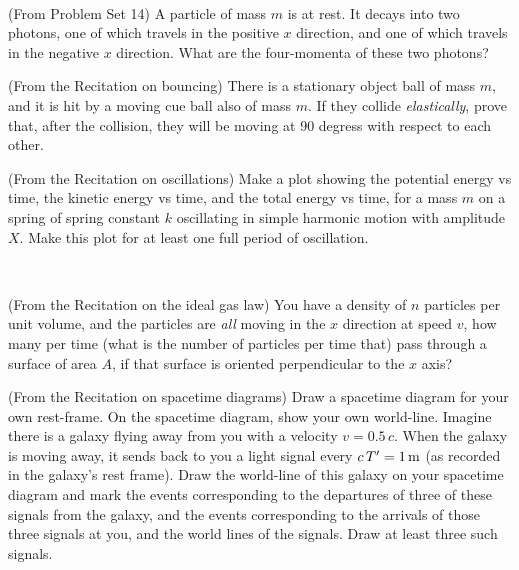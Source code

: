 \documentclass[12pt, letterpaper]{article}
\begin{document}
\vfill
~\clearpage

\begin{problem} (From Problem Set 14)
  A particle of mass $m$ is at rest.
  It decays into two photons, one of which travels in the positive $x$ direction,
  and one of which travels in the negative $x$ direction.
  What are the four-momenta of these two photons?
\end{problem}

\vfill

\begin{problem} (From the Recitation on bouncing)
  There is a stationary object ball of mass $m$, and it is hit
  by a moving cue ball also of mass $m$.
  If they collide \emph{elastically}, prove that, after the collision,
  they will be moving at 90 degress with respect to each other.
\end{problem}

\vfill

\begin{problem} (From the Recitation on oscillations)
  Make a plot showing the potential energy vs time, the kinetic energy vs time,
  and the total energy vs time, for a mass $m$ on a spring of spring constant $k$
  oscillating in simple harmonic
  motion with amplitude $X$. Make this plot for at least one full period of oscillation.
\end{problem}

\vfill
~\clearpage

\begin{problem} (From the Recitation on the ideal gas law)
  You have a density of $n$ particles per unit volume,
  and the particles are \emph{all} moving in the $x$ direction at speed $v$,
  how many per time (what is the number of particles per time that) pass through a surface of area $A$,
  if that surface is oriented perpendicular to the $x$ axis?
\end{problem}

\vfill

\begin{problem} (From the Recitation on spacetime diagrams)
Draw a spacetime diagram for your own rest-frame.  On the spacetime
diagram, show your own world-line.
Imagine there is a galaxy flying away from you with a velocity $v =
0.5\,c$. When the galaxy is moving away, it sends back to you a light
signal every $c\,T'=1\,\mathrm{m}$ (as recorded in the galaxy's rest frame).
Draw the world-line of this galaxy on your spacetime diagram and mark
the events corresponding to the departures of three of these signals from the
galaxy, and the events corresponding to the arrivals of those three signals at
you, and the world lines of the signals. Draw at least three such signals.
\end{problem}
\end{document}
